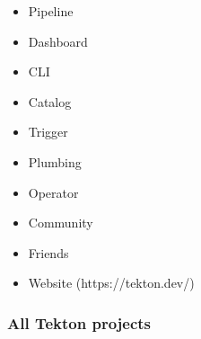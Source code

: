 \documentclass[aspectratio=169,11pt,hyperref={colorlinks=true}]{beamer}
\begin{document}
\begin{lblackrwhiteframe}
\begin{lblackrwhiteframe}
\begin{blackframe}

\begin{2columnsframe}
  {
  \begin{itemize}
    \item Pipeline
    \item Dashboard
    \item CLI
    \item Catalog
    \item Trigger
    \item Plumbing
  \end{itemize}
  }
  {
  \begin{itemize}
    \item Operator
    \item Community
    \item Friends
    \item Website (https://tekton.dev/)
  \end{itemize}
  }
  \frametitle{All Tekton projects}
\end{2columnsframe}


\end{blackframe}
\end{lblackrwhiteframe}
\end{lblackrwhiteframe}
\end{document}
